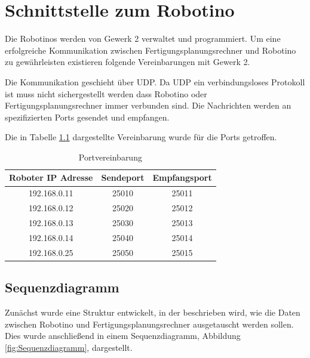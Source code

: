 
\chapter{Schnittstelle zum Robotino}
\label{sec:Schnittstellen}

\label{sec:Gewerk2Protokoll}

Die Robotinos werden von Gewerk 2 verwaltet und programmiert. Um eine erfolgreiche Kommunikation zwischen Fertigungsplanungsrechner und Robotino zu gewährleisten existieren folgende Vereinbarungen mit Gewerk 2.

Die Kommunikation geschieht über UDP. Da UDP ein verbindungsloses Protokoll ist muss nicht sichergestellt werden dass Robotino oder Fertigungsplanungsrechner immer verbunden sind. Die Nachrichten werden an spezifizierten Ports gesendet und empfangen.

Die in Tabelle \ref{tab:Ports} dargestellte Vereinbarung wurde für die Ports getroffen.

\begin{table}[!ht]
	\centering
	\begin{tabular}{|c|c|c|}
		\hline
		Roboter IP Adresse & Sendeport &	Empfangsport \\
		\hline
		192.168.0.11 & 25010 & 25011 \\
    192.168.0.12 & 25020 & 25012 \\
    192.168.0.13 & 25030 & 25013 \\
    192.168.0.14 & 25040 & 25014 \\
    192.168.0.25 & 25050 & 25015 \\
		\hline
	\end{tabular}
	\caption{Portvereinbarung}
	\label{tab:Ports}
\end{table}

\section{Sequenzdiagramm}
\label{sec:sequenzdiagram}

Zunächst wurde eine Struktur entwickelt, in der beschrieben wird, wie die Daten zwischen Robotino und Fertigungsplanungsrechner ausgetauscht werden sollen. Dies wurde anschließend in einem Sequenzdiagramm, Abbildung \ref{fig:Sequenzdiagramm}, dargestellt. 

